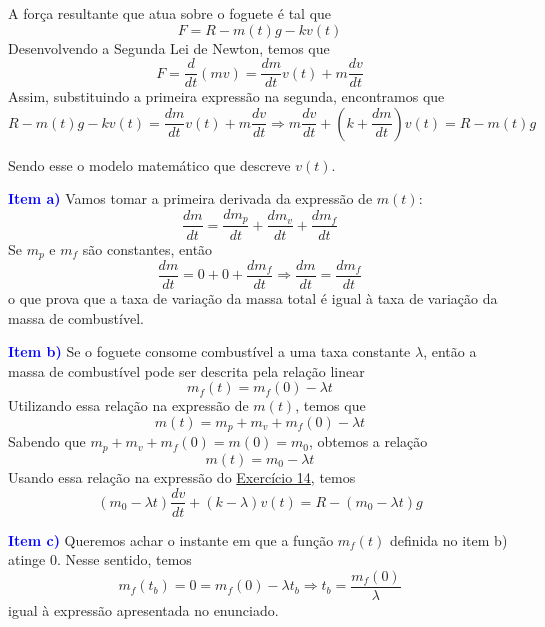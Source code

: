 \documentclass[oneside,12pt,a4paper]{report}
\begin{document}
\begin{tcolorbox}[enhanced, breakable, colback=blue!1!white,colframe=blue!75!black,title=\textbf{\hyperlink{quest:ex14}{\hypertarget{resp:ex14}{Exercício 14}}}]
\begin{figure}[H]
            \end{figure}

            \noindent A força resultante que atua sobre o foguete é tal que 
            \[F=R-m(t)g-kv(t)\]
            \noindent Desenvolvendo a Segunda Lei de Newton, temos que
            \[F=\frac{d}{dt}(mv)=\frac{dm}{dt}v(t)+m\frac{dv}{dt}\]
            \noindent Assim, substituindo a primeira expressão na segunda, encontramos que
            \[R-m(t)g-kv(t) = \frac{dm}{dt}v(t)+m\frac{dv}{dt}\Rightarrow\boxed{m\frac{dv}{dt} + \left(k+\frac{dm}{dt}\right)v(t) = R - m(t)g}\]

            Sendo esse o modelo matemático que descreve $v(t)$.

        \end{tcolorbox}

        \begin{tcolorbox}[enhanced, breakable, colback=blue!1!white,colframe=blue!75!black,title=\textbf{\hyperlink{quest:ex15}{\hypertarget{resp:ex15}{Exercício 15}}}]
            \noindent\textcolor{blue}{\textbf{Item a)}} Vamos tomar a primeira derivada da expressão de $m(t)$:
            \[\frac{dm}{dt}=\frac{dm_p}{dt}+\frac{dm_v}{dt}+\frac{dm_f}{dt}\]
            \noindent Se $m_p$ e $m_f$ são constantes, então
            \[\frac{dm}{dt}=0+0+\frac{dm_f}{dt}\Rightarrow\boxed{\frac{dm}{dt}=\frac{dm_f}{dt}}\]
            \noindent o que prova que a taxa de variação da massa total é igual à taxa de variação da massa de combustível.

            \noindent\textcolor{blue}{\textbf{Item b)}} Se o foguete consome combustível a uma taxa constante $\lambda$, então a massa de combustível pode ser descrita pela relação linear
            \[m_f(t)=m_f(0)-\lambda t\]
            Utilizando essa relação na expressão de $m(t)$, temos que
            \[m(t)=m_p+m_v+m_f(0)-\lambda t\]
            Sabendo que $m_p+m_v+m_f(0)=m(0)=m_0$, obtemos a relação
            \[m(t)=m_0-\lambda t\]
            Usando essa relação na expressão do \hyperlink{resp:ex14}{Exercício 14}, temos
            \[\boxed{(m_0-\lambda t)\frac{dv}{dt}+(k-\lambda)v(t)=R-(m_0-\lambda t)g}\]

            \noindent\textcolor{blue}{\textbf{Item c)}} Queremos achar o instante em que a função $m_f(t)$ definida no item b) atinge $0$. Nesse sentido, temos
            \[m_f(t_b)=0=m_f(0)-\lambda t_b\Rightarrow\boxed{t_b=\frac{m_f(0)}{\lambda}}\]
            \noindent igual à expressão apresentada no enunciado.
        \end{tcolorbox}
\end{document}

